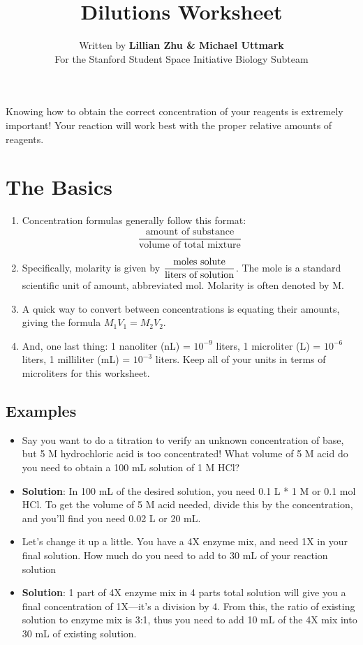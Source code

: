 \documentclass[letterpaper]{article}
\title{Dilutions Worksheet} %
\author{Written by \textbf{Lillian Zhu \& Michael Uttmark}\\ %
        For the Stanford Student Space Initiative Biology Subteam}
\newcommand{\uL}{\micro{}L}
\begin{document}
\maketitle
Knowing how to obtain the correct concentration of your reagents is extremely important! Your reaction will work best with the proper relative amounts of reagents.
\section*{The Basics}%
\begin{enumerate} %
\item{Concentration formulas generally follow this format:}
$$
\frac{\textrm{amount of substance}}{\textrm{volume of total mixture}}
$$
\item{Specifically, molarity is given by $\mathlarger{\frac{\textrm{moles solute}}{\textrm{liters of solution}}}$. The mole is a standard scientific unit of amount, abbreviated mol. Molarity is often denoted by M.}

\item{A quick way to convert between concentrations is equating their amounts, giving the formula $M_1V_1 = M_2V_2$.}
\item{And, one last thing: 1 nanoliter (nL) = $10^{-9}$ liters, 1 microliter (\uL{}) = $10^{-6}$ liters, 1 milliliter (mL) = $10^{-3}$ liters. Keep all of your units in terms of microliters for this worksheet.}
\end{enumerate}

\subsection*{Examples} 
\begin{itemize}
\item{Say you want to do a titration to verify an unknown concentration of base, but 5 M hydrochloric acid is too concentrated! What volume of 5 M acid do you need to obtain a 100 mL solution of 1 M HCl?\begin{flushright}\underline{\hspace{3cm}}\end{flushright}}
\item{\textbf{Solution}: In 100 mL of the desired solution, you need 0.1 L * 1 M or 0.1 mol HCl. To get the volume of 5 M acid needed, divide this by the concentration, and you'll find you need 0.02 L or 20 mL.}
\item{Let's change it up a little. You have a 4X enzyme mix, and need 1X in your final solution. How much do you need to add to 30 mL of your reaction solution\begin{flushright}\underline{\hspace{3cm}}\end{flushright}}
\item{\textbf{Solution}: 1 part of 4X enzyme mix in 4 parts total solution will give you a final concentration of 1X—it's a division by 4. From this, the ratio of existing solution to enzyme mix is 3:1, thus you need to add 10 mL of the 4X mix into 30 mL of existing solution.}
\end{itemize}
\pagebreak{}
\end{document}

